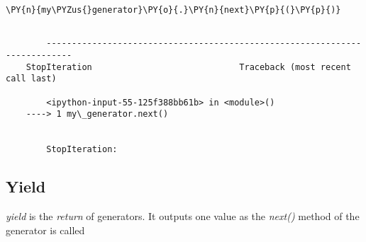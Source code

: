 {\par%
\vspace{-1\baselineskip}%
}%
\begin{notebookcell}[55]%
\begin{addmargin}[\cellleftmargin]{0em}%
{\smaller%
\par%
%
\vspace{-1\smallerfontscale}%
\begin{Verbatim}[commandchars=\\\{\}]
\PY{n}{my\PYZus{}generator}\PY{o}{.}\PY{n}{next}\PY{p}{(}\PY{p}{)}
\end{Verbatim}
%
\par%
\vspace{-1\smallerfontscale}}%
\end{addmargin}
\end{notebookcell}

\par\vspace{1\smallerfontscale}%
    \begin{addmargin}[\cellleftmargin]{0em}%
    {\smaller%
    \vspace{-1\smallerfontscale}%
    
    \begin{Verbatim}[commandchars=\\\{\}]

        ---------------------------------------------------------------------------
    StopIteration                             Traceback (most recent call last)

        <ipython-input-55-125f388bb61b> in <module>()
    ----> 1 my\_generator.next()
    

        StopIteration: 

    \end{Verbatim}
}%
    \end{addmargin}%

    \subsection{Yield}


    \emph{yield} is the \emph{return} of generators. It outputs one value as
the \emph{next()} method of the generator is called

